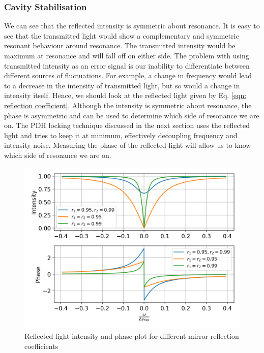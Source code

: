 \documentclass{Resources/cquicc}
\begin{document}
\subsubsection{Cavity Stabilisation}
We can see that the reflected intensity is symmetric about resonance. It is easy to see that the transmitted light would show a complementary and symmetric resonant behaviour around resonance. The transmitted intensity would be maximum at resonance and will fall off on either side. The problem with using transmitted intensity as an error signal is our inability to differentiate between different sources of fluctuations. For example, a change in frequency would lead to a decrease in the intensity of transmitted light, but so would a change in intensity itself. Hence, we should look at the reflected light given by Eq. \ref{eqn: reflection coefficient}. Although the intensity is symmetric about resonance, the phase is asymmetric and can be used to determine which side of resonance we are on. The PDH locking technique discussed in the next section uses the reflected light and tries to keep it at minimum, effectively decoupling frequency and intensity noise. Measuring the phase of the reflected light will allow us to know which side of resonance we are on. 
\begin{figure}
    \centering
    \includegraphics[width=\linewidth]{images/reflection_coefficient.png}
    \caption{Reflected light intensity and phase plot for different mirror reflection coefficients}
    \label{fig:reflection_coefficient}
\end{figure}
\end{document}
